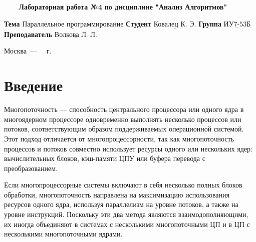 \documentclass[a4paper,14pt, unknownkeysallowed]{extreport}
\begin{document}
\begin{titlepage}
	
	\begin{center}
		\noindent\begin{minipage}{1.3\textwidth}\centering
		\Large\textbf{   ~~~ Лабораторная работа №4}\newline
		\textbf{по дисциплине "Анализ Алгоритмов"}\newline\newline\newline
		\end{minipage}
	\end{center}
	
	\noindent\textbf{Тема} 			$\underline{\text{Параллельное программирование}}$\newline\newline
	\noindent\textbf{Студент} 		$\underline{\text{Ковалец К. Э.}}$\newline\newline
	\noindent\textbf{Группа} 		$\underline{\text{ИУ7-53Б}}$\newline\newline
	\noindent\textbf{Преподаватель} $\underline{\text{Волкова Л. Л.}}$\newline
	
	\begin{center}
		\vfill
		Москва~---~\the\year
		~г.
	\end{center}
	\restoregeometry
\end{titlepage}



\renewcommand{\contentsname}{Содержание} 
\tableofcontents
\setcounter{page}{2}





\chapter*{Введение}


Многопоточность — способность центрального процессора или одного ядра в многоядерном процессоре одновременно выполнять несколько процессов или потоков, соответствующим образом поддерживаемых операционной системой. Этот подход отличается от многопроцессорности, так как многопоточность процессов и потоков совместно использует ресурсы одного или нескольких ядер: вычислительных блоков, кэш-памяти ЦПУ или буфера перевода с преобразованием.

Если многопроцессорные системы включают в себя несколько полных блоков обработки, многопоточность направлена на максимизацию использования ресурсов одного ядра, используя параллелизм на уровне потоков, а также на уровне инструкций.
Поскольку эти два метода являются взаимодополняющими, их иногда объединяют в системах с несколькими многопоточными ЦП и в ЦП с несколькими многопоточными ядрами.
\end{document}
